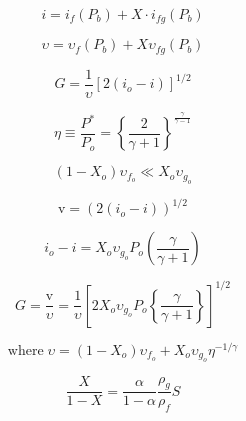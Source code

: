 \documentclass[12pt,fleqn]{report}
\begin{document}
{\newpage
\clearpage
\samepage \begin{equation}i = i_{f} \left( P_{b} \right) + X\cdot i_{fg} \left( P_{b} \right)
\end{equation}
}

{\newpage
\clearpage
\samepage \begin{equation}\upsilon = \upsilon_{f} \left( P_{b} \right) + X \upsilon_{fg} \left( P_{b} \right)
\end{equation}
}

{\newpage
\clearpage
\samepage \begin{equation}G = \frac{1}{\upsilon} \left[ 2 \left( i_{o} - i \right) \right]^{1/2}
\end{equation}
}

{\newpage
\clearpage
\samepage \begin{equation}\eta \equiv \frac{P^{*}}{P_{o}} = \left\{ \frac{2}{\gamma +1} \right\}^{\frac{\gamma}{\gamma -1}}
\end{equation}
}

{\newpage
\clearpage
\samepage \begin{equation}\left( 1 - X_{o} \right) \upsilon_{f_{o}} \ll X_{o}\upsilon_{g_{o}}
\end{equation}
}

{\newpage
\clearpage
\samepage \begin{equation}\mbox{v} = \left( 2 \left( i_{o} - i \right) \right)^{1/2}
\end{equation}
}

{\newpage
\clearpage
\samepage \begin{equation}i_{o} - i = X_{o}\upsilon_{g_{o}}P_{o} \left( \frac{\gamma}{\gamma +1} \right)
\end{equation}
}

{\newpage
\clearpage
\samepage \begin{equation}G = \frac{\mbox{v}}{\upsilon} = \frac{1}{\upsilon} \left[ 2X_{o}\upsilon_{g_{o}}P_{o} \left\{ \frac{\gamma}{\gamma +1} \right\} \right]^{1/2}
\end{equation}
}

{\newpage
\clearpage
\samepage \begin{equation}\mbox{where} \; \upsilon = \left( 1 - X_{o} \right) \upsilon_{f_{o}} + X_{o} \upsilon_{g_{o}} \eta^{-1/\gamma}
\end{equation}
}

{\newpage
\clearpage
\samepage \begin{equation}\frac{X}{1-X} = \frac{\alpha}{1-\alpha} \frac{\rho_{g}}{\rho_{f}}S
\end{equation}
}
\end{document}
